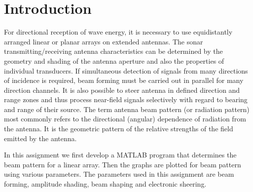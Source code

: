  \chapter*{Introduction}

\noindent For directional reception of wave energy, it is necessary to use equidistantly arranged linear or planar arrays on extended antennas. The sonar transmitting/receiving antenna characteristics can be determined by the geometry and shading of the antenna aperture and also the properties of individual transducers. If simultaneous detection of signals from many directions of incidence is required, beam forming must be carried out in parallel
for many direction channels. It is also possible to steer antenna in defined direction and range zones and thus process near-field signals selectively with regard to bearing and range of their source. The term antenna beam pattern (or radiation pattern) most commonly refers to the directional (angular) dependence of radiation from the antenna. It is the geometric pattern of the relative strengths of the field emitted by the antenna. 

\noindent In this assignment we first develop a MATLAB program that determines the beam pattern for a linear array. Then the graphs are plotted for beam pattern using various parameters. The parameters used in this assignment are beam forming, amplitude shading, beam shaping and electronic sheering.


